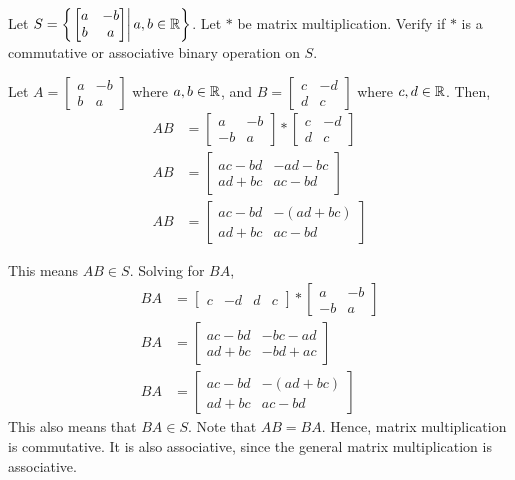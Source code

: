     \begin{example}
        Let \(\displaystyle S = \left\{\left.\begin{bmatrix}
            a & -b \\ b & a
        \end{bmatrix}\right| a,b\in\mathbb{R}\right\}\). Let \(*\) be matrix multiplication. Verify if \(*\) is a commutative or associative binary operation on \(S\).

        Let \(A = \begin{bmatrix} a & -b \\ b & a \end{bmatrix}\) where \(a,b\in\mathbb{R}\), and \(B = \begin{bmatrix} c & -d \\ d & c \end{bmatrix}\) where \(c,d\in\mathbb{R}\). Then,
        \begin{align*}
            AB &= \begin{bmatrix} a & -b \\ -b & a \end{bmatrix} *\begin{bmatrix} c & -d \\ d & c \end{bmatrix} \\
            AB &= \begin{bmatrix}
                ac - bd & -ad - bc \\
                ad + bc & ac - bd
            \end{bmatrix} \\
            AB &= \begin{bmatrix}
                ac - bd & -(ad + bc) \\
                ad + bc & ac - bd
            \end{bmatrix}
        \end{align*}

        This means \(AB\in S\). Solving for \(BA\),
        \begin{align*}
            BA &= \begin{bmatrix} c & -d & d & c \end{bmatrix} *\begin{bmatrix} a & -b \\ -b & a \end{bmatrix} \\
            BA &= \begin{bmatrix}
                ac - bd & -bc - ad \\
                ad + bc & -bd + ac 
            \end{bmatrix} \\
            BA &= \begin{bmatrix}
                ac - bd & -(ad + bc) \\
                ad + bc & ac - bd
            \end{bmatrix}
        \end{align*}
        This also means that \(BA\in S\). Note that \(AB = BA\). Hence, matrix multiplication is commutative. It is also associative, since the general matrix multiplication is associative.
    \end{example}


